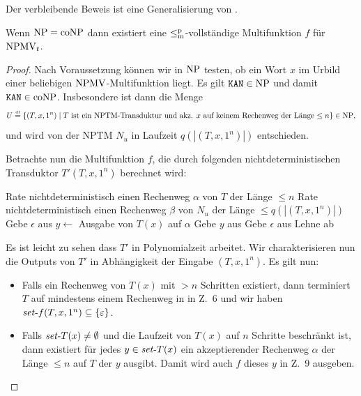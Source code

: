 Der verbleibende Beweis ist eine Generalisierung von \textcite{dingel_separation_2022}.
\begin{theorem}\label{thm:npmvt-vs-npconp}
    Wenn $\mathrm{NP}=\mathrm{coNP}$ dann existiert eine $\leq_\mathrm{m}^\mathrm{p}$-vollständige Multifunktion $f$ für $\mathrm{NPMV}_t$.
\end{theorem}
\begin{proof}
    Nach Voraussetzung können wir in $\mathrm{NP}$ testen, ob ein Wort $x$ im Urbild einer beliebigen $\mathrm{NPMV}$-Multifunktion liegt.
    Es gilt $\mathtt{KAN}\in\mathrm{NP}$ und damit $\mathtt{KAN}\in\mathrm{coNP}$. Insbesondere ist dann die Menge
    \[ U \stackrel{\text{\smash{\tiny df}}}{=}  \{ (T, x, 1^n) \mid \text{$T$ ist ein NPTM-Transduktur und akz. $x$ auf keinem Rechenweg der Länge $\leq n$} \} \in\mathrm{NP},  \]
    und wird von der NPTM $N_u$ in Laufzeit $q(|(T, x, 1^n)|)$ entschieden.

    Betrachte nun die Multifunktion $f$, die durch folgenden nichtdeterministischen Transduktor $T'(T, x, 1^n)$ berechnet wird:\\
    \begin{algorithm}[H]
        Rate nichtdeterministisch einen Rechenweg $\alpha$ von $T$ der Länge $\leq n$\;
        Rate nichtdeterministisch einen Rechenweg $\beta$ von $N_u$ der Länge $\leq q(|(T, x, 1^n)|)$\;
        { Gebe $\epsilon$ aus }
        {
            $y\gets $ Ausgabe von $T(x)$ auf $\alpha$\;
            Gebe $y$ aus\;
        }
        {
            Gebe $\epsilon$ aus
        }
        \lElse
        {
            Lehne ab
        }
    \end{algorithm}
    Es ist leicht zu sehen dass $T'$ in Polynomialzeit arbeitet. 
    Wir charakterisieren nun die Outputs von $T'$  in Abhängigkeit der Eingabe $(T, x, 1^n)$.
    Es gilt nun:
    \begin{itemize}[nosep]
        \item Falls ein Rechenweg von $T(x)$ mit $>n$ Schritten existiert, dann terminiert $T$ auf mindestens einem Rechenweg in in Z.~6 und wir haben $\mathit{set}\text{-}{f}(T, x, 1^n)\subseteq\{\varepsilon\}$.
        \item Falls $\mathit{set}\text{-}{T}(x)\neq\emptyset$ und die Laufzeit von $T(x)$ auf $n$ Schritte beschränkt ist, dann existiert für jedes $y\in \mathit{set}\text{-}{T}(x)$ ein akzeptierender Rechenweg $\alpha$ der Länge $\leq n$ auf $T$ der $y$ ausgibt. Damit wird auch $f$ dieses $y$ in Z.~9 ausgeben.

\end{itemize}
\end{proof}
